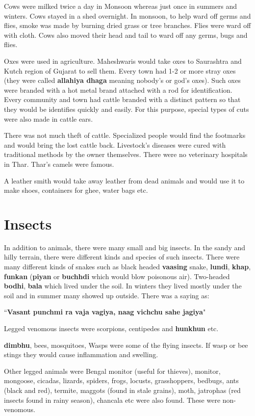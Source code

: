 Cows were milked twice a day in Monsoon whereas just once in summers and
winters. Cows stayed in a shed overnight. In monsoon, to help ward off germs
and flies, smoke was made by burning dried grass or tree branches. Flies were
ward off with cloth. Cows also moved their head and tail to ward off any germs,
bugs and flies.

Oxes were used in agriculture. Maheshwaris would take oxes to Saurashtra and
Kutch region of Gujarat to sell them. Every town had 1-2 or more stray oxes
(they were called \textbf{allahiya dhaga} meaning nobody's or god's oxes). Such
oxes were branded with a hot metal brand attached with a rod for
identification. Every community and town had cattle branded with a distinct
pattern so that they would be identifies quickly and easily. For this purpose,
special types of cuts were also made in cattle ears.

There was not much theft of cattle. Specialized people would find the
footmarks and would bring the lost cattle back. Livestock's diseases were cured
with traditional methods by the owner themselves. There were no veterinary
hospitals in Thar. Thar's camels were famous.

A leather smith would take away leather from dead animals and would use it to
make shoes, containers for ghee, water bags etc.

\section{Insects}
In addition to animals, there were many small and big insects. In the sandy and
hilly terrain, there were different kinds and species of such insects. There
were many different kinds of snakes such as black headed \textbf{vaasing}
snake, \textbf{lundi}, \textbf{khap}, \textbf{funkan} (\textbf{piyan} or
\textbf{buchhdi} which would blow poisonous air). Two-headed \textbf{bodhi},
\textbf{bala} which lived under the soil. In winters they lived mostly under
the soil and in summer many showed up outside. There was a saying as:

``\textbf{Vasant punchmi ra vaja vagiya, naag vichchu sahe jagiya}"

Legged venomous insects were scorpions, centipedes and \textbf{hunkhun} etc.

\textbf{dimbhu}, bees, mosquitoes, Wasps were some of the flying insects. If
wasp or bee stings they would cause inflammation and swelling. 

Other legged animals were Bengal monitor (useful for thieves), monitor,
mongoose, cicadas, lizards, spiders, frogs, locusts, grasshoppers, bedbugs,
ants (black and red), termite, maggots (found in stale grains), moth, jatrophas
(red insects found in rainy season), chancala etc were also found. These were
non-venomous.

